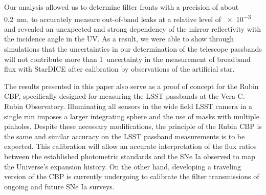 Our analysis allowed us to determine filter fronts with a precision of
about \SI{0.2}{\nano\meter}, to accurately measure out-of-band leaks at a relative
level of \num{e-3} and revealed an unexpected and strong dependency of
the mirror reflectivity with the incidence angle in the UV. As a
result, we were able to show through simulations that the uncertainties in our determination of the
telescope passbands will not contribute more than 1\textperthousand\
uncertainty in the measurement of broadband flux with StarDICE after
calibration by observations of the artificial star. 

The results presented in this paper also serve as a proof of concept for the Rubin CBP, specifically designed for measuring the LSST passbands at the Vera C. Rubin Observatory. Illuminating all sensors in the wide field LSST camera in a single run imposes a larger integrating sphere and the use of masks with multiple pinholes. Despite these necessary modifications, the principle of the Rubin CBP is the same and similar accuracy on the LSST passband measurements is to be expected. This calibration will allow an accurate interpretation of the flux ratios between the established photometric standards and the SNe Ia observed to map the Universe's expansion history. On the other hand, developing a traveling version of the CBP is currently undergoing \citep{2024RASTI...3..125S} to calibrate the filter transmissions of ongoing and future SNe Ia surveys.

